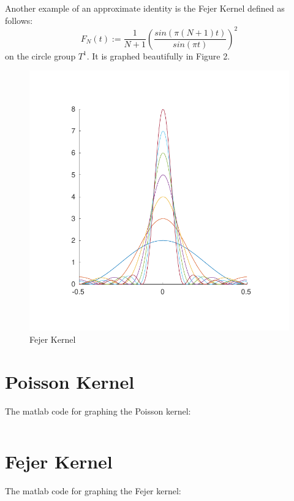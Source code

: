 \begin{example}
Another example of an approximate identity is the Fejer Kernel defined as follows:
\begin{equation*}
F_N(t) := \frac{1}{N+1}(\frac{sin(\pi(N+1)t)}{sin(\pi t)})^2
\end{equation*}
on the circle group $T^1$. It is graphed beautifully in Figure 2.

\begin{figure}[h!bt]
\centering
\includegraphics[scale=0.7]{matlab/fejerkernel}
\caption{Fejer Kernel}
\label{fejer}
\end{figure}

\end{example}

\begin{appendix}
\section{Poisson Kernel}
The matlab code for graphing the Poisson kernel:

\inputminted{matlab}{matlab/aproIdInR.m}

\section{Fejer Kernel}
The matlab code for graphing the Fejer kernel:
\inputminted{matlab}{matlab/fejerkernel.m}

\end{appendix}

